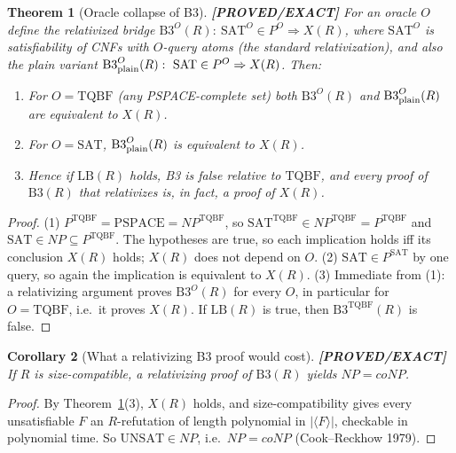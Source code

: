\documentclass[11pt]{article}
\newtheorem{theorem}{Theorem}
\newtheorem{corollary}[theorem]{Corollary}
\theoremstyle{definition}
\theoremstyle{remark}
\newcommand{\SAT}{\mathrm{SAT}}
\newcommand{\UNSAT}{\mathrm{UNSAT}}
\newcommand{\TQBF}{\mathrm{TQBF}}
\newcommand{\status}[1]{\textbf{[#1]}}
\begin{document}
\begin{theorem}[Oracle collapse of B3]\label{thm:collapse}
\status{PROVED/EXACT}
For an oracle $O$ define the relativized bridge
$\mathrm{B3}^O(R):\ \SAT^O\in P^O\Rightarrow X(R)$, where $\SAT^O$ is satisfiability of
CNFs with $O$-query atoms (the standard relativization), and also the plain variant
$\mathrm{B3}_{\rm plain}^O(R):\ \SAT\in P^O\Rightarrow X(R)$. Then:
\begin{enumerate}
\item For $O=\TQBF$ (any PSPACE-complete set) both $\mathrm{B3}^O(R)$ and
$\mathrm{B3}_{\rm plain}^O(R)$ are \emph{equivalent to} $X(R)$.
\item For $O=\SAT$, $\mathrm{B3}_{\rm plain}^O(R)$ is equivalent to $X(R)$.
\item Hence if $\mathrm{LB}(R)$ holds, B3 is \emph{false} relative to $\TQBF$, and every
proof of $\mathrm{B3}(R)$ that relativizes is, in fact, a proof of $X(R)$.
\end{enumerate}
\end{theorem}

\begin{proof}
(1) $P^{\TQBF}=\mathrm{PSPACE}=NP^{\TQBF}$, so $\SAT^{\TQBF}\in NP^{\TQBF}=P^{\TQBF}$ and
$\SAT\in NP\subseteq P^{\TQBF}$. The hypotheses are true, so each implication holds iff its
conclusion $X(R)$ holds; $X(R)$ does not depend on $O$.
(2) $\SAT\in P^{\SAT}$ by one query, so again the implication is equivalent to $X(R)$.
(3) Immediate from (1): a relativizing argument proves $\mathrm{B3}^O(R)$ for every $O$,
in particular for $O=\TQBF$, i.e.\ it proves $X(R)$. If $\mathrm{LB}(R)$ is true, then
$\mathrm{B3}^{\TQBF}(R)$ is false.
\end{proof}

\begin{corollary}[What a relativizing B3 proof would cost]\label{cor:np}
\status{PROVED/EXACT}
If $R$ is size-compatible, a relativizing proof of $\mathrm{B3}(R)$ yields $NP=coNP$.
\end{corollary}
\begin{proof}
By Theorem~\ref{thm:collapse}(3), $X(R)$ holds, and size-compatibility gives every
unsatisfiable $F$ an $R$-refutation of length polynomial in $|\langle F\rangle|$, checkable in
polynomial time. So $\UNSAT\in NP$, i.e.\ $NP=coNP$ (Cook--Reckhow 1979).
\end{proof}
\end{document}
